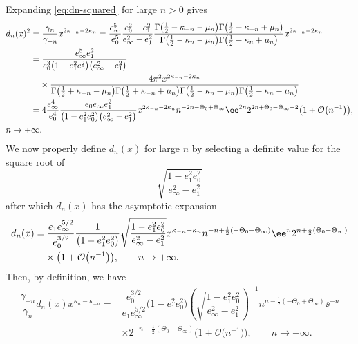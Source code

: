 Expanding \eqref{eq:dn-squared} for large $n>0$ gives
\begin{align*}
& d_n(x)^2= \frac{\gamma_n}{\gamma_{-n}}x^{2\kappa_{-n}-2\kappa_n} = \dfrac{e_\infty^5}{e_0^5} \dfrac{e_0^2 - e_1^2}{e_\infty^2 - e_1^2} \dfrac{\Gamma\big( \frac{1}{2} - \kappa_{-n} -\mu_n\big) \Gamma\big( \frac{1}{2} - \kappa_{-n} + \mu_n\big)}{\Gamma\big( \frac{1}{2} - \kappa_{n} -\mu_n\big) \Gamma\big( \frac{1}{2} - \kappa_{n} +\mu_n\big)} x^{2\kappa_{-n}-2\kappa_n}\\
&\hphantom{d_n(x)^2}{} = \dfrac{e_\infty^5 e_1^2}{e_0^3\big(1 - e_1^2 e_0^2\big)\big(e_\infty^2 - e_1^2\big)} \\
&\hphantom{d_n(x)^2=}{} \times\dfrac{ 4\pi^2x^{2\kappa_{-n}-2\kappa_n}}{\Gamma \big( \frac{1}{2} + \kappa_{-n}- \mu_n \big) \Gamma \big( \frac{1}{2} + \kappa_{-n} + \mu_n \big) \Gamma \big( \frac{1}{2} - \kappa_n + \mu_n\big) \Gamma \big( \frac{1}{2} - \kappa_n - \mu_n \big)} \\
&\hphantom{d_n(x)^2}{}=
 4\dfrac{e_\infty^4}{e_0^4}\dfrac{e_0e_\infty e_1^2}{\big(1 - e_1^2 e_0^2\big)\big(e_\infty^2 - e_1^2\big)} x^{2\kappa_{-n}-2\kappa_n}n^{-2n-\Theta_0+\Theta_\infty}\ee^{2n}2^{2n+\Theta_0-\Theta_\infty-2}\big(1+\mathcal{O}\big(n^{-1}\big)\big), \\
& n \to +\infty.
\end{align*}
We now properly define $d_n(x)$ for large $n$ by selecting a definite value for the square root of
\begin{equation}
\label{eq:V-root}
\sqrt{\dfrac{1 - e_1^2 e_0^2}{e_\infty^2 - e_1^2} }
\end{equation}
after which $d_n(x)$ has the asymptotic expansion
\begin{align*}
&d_n(x) = \dfrac{e_1 e_\infty^{5/2}}{e_0^{3/2}} \dfrac{1}{\big(1 - e_1^2 e_0^2\big)}\sqrt{\dfrac{1 - e_1^2 e_0^2}{e_\infty^2 - e_1^2} } x^{\kappa_{-n}-\kappa_n} n^{-n+\frac{1}{2}(-\Theta_0+\Theta_\infty)}\ee^{n}2^{n + \frac{1}{2}(\Theta_0-\Theta_\infty)}\\
&\hphantom{d_n(x) =}{}
\times\big(1+\mathcal{O}\big(n^{-1}\big)\big), \qquad n \to +\infty.
\end{align*}
Then, by definition, we have
\begin{align*}
\dfrac{\gamma_{-n}}{\gamma_n} d_n(x) x^{\kappa_n - \kappa_{-n}} ={}& \dfrac{e_0^{3/2}}{e_1 e_\infty^{5/2}} {\big(1 - e_1^2 e_0^2\big)}\left(\sqrt{\dfrac{1 - e_1^2 e_0^2}{e_\infty^2 - e_1^2} }\right)^{-1}n^{n-\frac{1}{2}(-\Theta_0+\Theta_\infty)}\ee^{-n}\\&
\times2^{-n - \frac{1}{2}(\Theta_0-\Theta_\infty)}\big(1+\mathcal{O}\big(n^{-1}\big)\big),\qquad n \to +\infty.
\end{align*}
